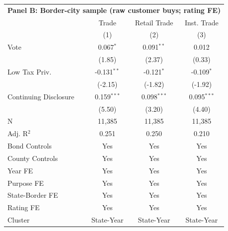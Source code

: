 \begingroup
\centering
\begin{tabular*}{\textwidth}{@{\extracolsep{\fill}}lccc}
\multicolumn{5}{l}{\textbf{Panel B: Border-city sample (raw customer buys; rating FE)}}\\

\addlinespace
   \toprule
                         & Trade         & Retail Trade  & Inst. Trade\\  
                         & (1)           & (2)           & (3)\\  
   \midrule 
   Vote                  & 0.067$^{*}$   & 0.091$^{**}$  & 0.012\\   
                         & (1.85)       & (2.37)       & (0.33)\\   
   Low Tax Priv.         & -0.131$^{**}$ & -0.121$^{*}$  & -0.109$^{*}$\\   
                         & (-2.15)      & (-1.82)      & (-1.92)\\   
   Continuing Disclosure & 0.159$^{***}$ & 0.098$^{***}$ & 0.095$^{***}$\\   
                         & (5.50)       & (3.20)       & (4.40)\\   
   \hline
   N          & 11,385        & 11,385        & 11,385\\  
   Adj. R$^2$        & 0.251         & 0.250         & 0.210\\  
   Bond Controls         & Yes           & Yes           & Yes\\  
   County Controls       & Yes           & Yes           & Yes\\  
   Year FE               & Yes           & Yes           & Yes\\  
   Purpose FE            & Yes           & Yes           & Yes\\  
   State-Border FE       & Yes           & Yes           & Yes\\  
   Rating FE             & Yes           & Yes           & Yes\\  
   Cluster              & State-Year & State-Year & State-Year\\  
   \bottomrule
\end{tabular*}
\par\endgroup
